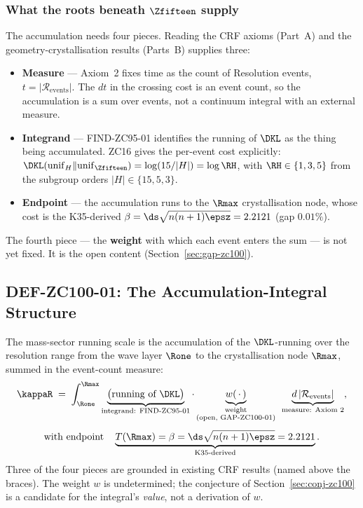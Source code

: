 \documentclass[12pt, a4paper]{article}
\begin{document}
\subsubsection{What the roots beneath $\Zfifteen$ supply}

The accumulation needs four pieces. Reading the CRF axioms (Part~A) and the
geometry-crystallisation results (Parts~B) supplies three:
\begin{itemize}[leftmargin=1.6em, noitemsep]
  \item \textbf{Measure} --- Axiom~2 fixes time as the count of Resolution
    events, $t=|\mathcal{R}_{\mathrm{events}}|$. The $dt$ in the crossing cost
    is an event count, so the accumulation is a sum over events, not a continuum
    integral with an external measure.
  \item \textbf{Integrand} --- FIND-ZC95-01 identifies the running of $\DKL$ as
    the thing being accumulated. ZC16 gives the per-event cost explicitly:
    $\DKL(\mathrm{unif}_H\|\mathrm{unif}_{\Zfifteen})=\log(15/|H|)=\log\RH$, with
    $\RH\in\{1,3,5\}$ from the subgroup orders $|H|\in\{15,5,3\}$.
  \item \textbf{Endpoint} --- the accumulation runs to the $\Rmax$
    crystallisation node, whose cost is the K35-derived
    $\beta=\ds\sqrt{n(n+1)\epsz}=2.2121$ (gap $0.01\%$).
\end{itemize}
The fourth piece --- the \textbf{weight} with which each event enters the sum
--- is not yet fixed. It is the open content (Section~\ref{sec:gap-zc100}).

\subsection{DEF-ZC100-01: The Accumulation-Integral Structure}
\label{sec:setup-zc100}

\begin{formalbox}[title={DEF-ZC100-01: Structure of the Accumulation Integral
  for $\kappaR$}]
The mass-sector running scale is the accumulation of the $\DKL$-running over the
resolution range from the wave layer $\Rone$ to the crystallisation node
$\Rmax$, summed in the event-count measure:
\begin{gather*}
  \kappaR \;=\; \int_{\Rone}^{\Rmax}
     \underbrace{\big(\text{running of }\DKL\big)}_{\text{integrand: FIND-ZC95-01}}
     \cdot
     \underbrace{w(\,\cdot\,)}_{\substack{\text{weight}\\ \text{(open, GAP-ZC100-01)}}}
     \;\,
     \underbrace{d\,|\mathcal{R}_{\mathrm{events}}|}_{\text{measure: Axiom 2}},
  \\[4pt]
  \text{with endpoint}\quad
  \underbrace{T(\Rmax)=\beta=\ds\sqrt{n(n+1)\epsz}=2.2121}_{\text{K35-derived}} .
\end{gather*}
Three of the four pieces are grounded in existing CRF results (named above the
braces). The weight $w$ is undetermined; the conjecture of
Section~\ref{sec:conj-zc100} is a candidate for the integral's \emph{value}, not a
derivation of $w$.
\end{formalbox}
\end{document}
